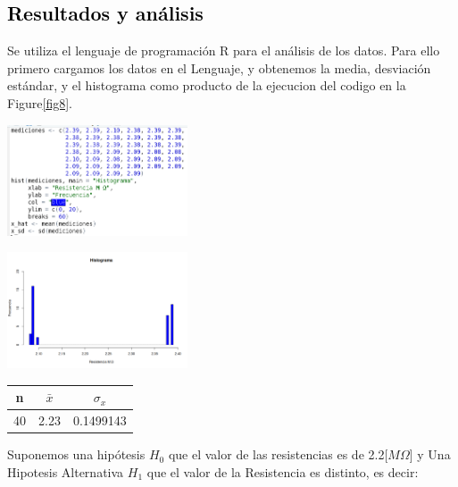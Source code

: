 \documentclass[11pt]{article}
\begin{document}
\begin{multicols}{2}
        \section{\textbf{\textcolor{black}{Resultados y análisis}}}
        \noindent Se utiliza el lenguaje de programación R para el análisis de los datos.
        Para ello primero cargamos los datos en el Lenguaje, y obtenemos la media, desviación
        estándar, y el histograma como producto de la ejecucion del codigo en la Figure\ref{fig8}.
        \begin{center}
            \includegraphics[width=0.4\textwidth]{img-1/code1}
        \end{center}

        \begin{center}
            \includegraphics[width=0.4\textwidth]{img-1/hist}
        \end{center}

        \begin{center}
            \begin{tabular}{||c|c|c||}
                \hline
                n  & $\bar{x}$ & $\sigma_x$  \\[0,1cm]
                \hline \hline
                40  & 2.23 & 0.1499143       \\ \hline
            \end{tabular}
            \label{t2}
        \end{center}

        Suponemos una hipótesis $H_0$ que el valor de las resistencias es de 2.2[$M\Omega$]
        y Una Hipotesis Alternativa $H_1$ que el valor de la Resistencia es distinto, es decir:


\end{multicols}
\end{document}
